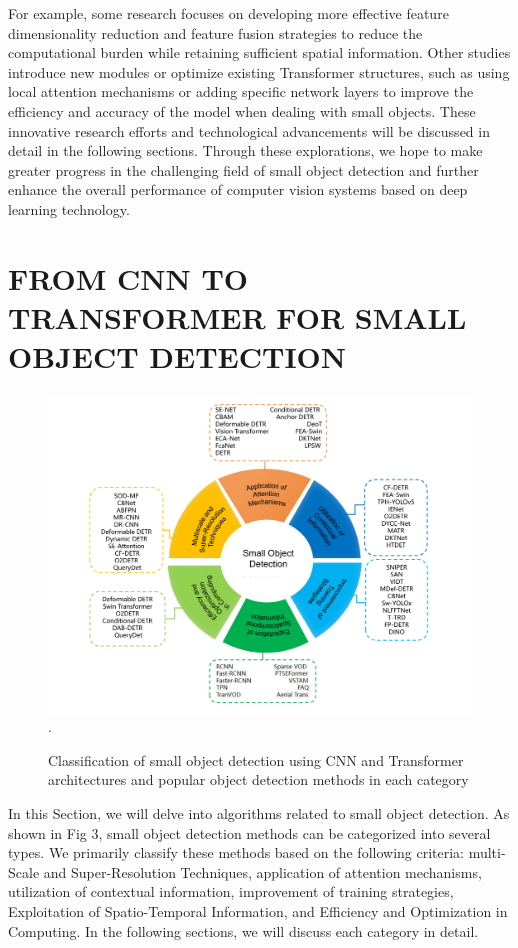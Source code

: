 \documentclass[journal]{IEEEtran}
\begin{document}
For example, some research focuses on developing more effective feature dimensionality reduction and feature fusion strategies to reduce the computational burden while retaining sufficient spatial information. Other studies introduce new modules or optimize existing Transformer structures, such as using local attention mechanisms or adding specific network layers to improve the efficiency and accuracy of the model when dealing with small objects. These innovative research efforts and technological advancements will be discussed in detail in the following sections. Through these explorations, we hope to make greater progress in the challenging field of small object detection and further enhance the overall performance of computer vision systems based on deep learning technology.




\section{FROM CNN TO TRANSFORMER FOR SMALL OBJECT DETECTION}


\begin{figure}[htbp]
	\centering
	\setlength{\abovecaptionskip}{-0.6cm}
	\includegraphics[width=\textwidth]{fig 3}
	\DeclareGraphicsExtensions.
	\caption{Classification of small object detection using CNN and Transformer architectures and popular object detection methods in each category}
	\label{fig 1}
\end{figure}

In this Section, we will delve into algorithms related to small object detection. As shown in Fig 3, small object detection methods can be categorized into several types. We primarily classify these methods based on the following criteria: multi-Scale and Super-Resolution Techniques, application of attention mechanisms, utilization of contextual information, improvement of training strategies, Exploitation of Spatio-Temporal Information, and Efficiency and Optimization in Computing. In the following sections, we will discuss each category in detail.
\end{document}

